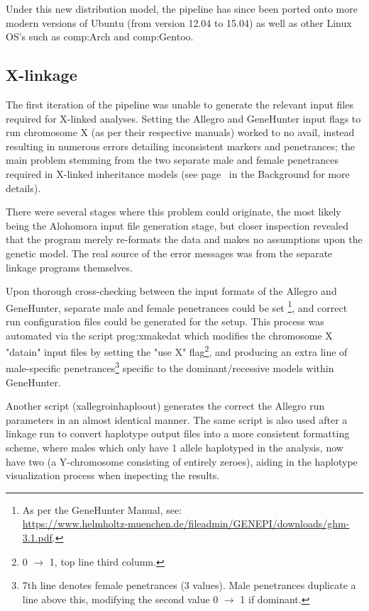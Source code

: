 Under this new distribution model, the pipeline has since been ported onto more modern versions of Ubuntu (from version 12.04 to 15.04) as well as other Linux OS's such as \gls{comp:Arch} and \gls{comp:Gentoo}.


\subsection{X-linkage}

\enlargethispage{\baselineskip}
The first iteration of the pipeline was unable to generate the relevant input files required for X-linked analyses. Setting the Allegro and GeneHunter input flags to run chromosome X (as per their respective manuals) worked to no avail, instead resulting in numerous errors detailing inconsistent markers and penetrances; the main problem stemming from the two separate male and female penetrances required in X-linked inheritance models (see page~\pageref{ref:back:xlinkrec} in the Background for more details).

There were several stages where this problem could originate, the most likely being the Alohomora input file generation stage, but closer inspection revealed that the program merely re-formats the data and makes no assumptions upon the genetic model. The real source of the error messages was from the separate linkage programs themselves.

Upon thorough cross-checking between the input formats of the Allegro and GeneHunter, separate male and female penetrances could be set \footnote{As per the GeneHunter Manual, see:\\\url{https://www.helmholtz-muenchen.de/fileadmin/GENEPI/downloads/ghm-3.1.pdf}.}, and correct run configuration files could be generated for the setup. This process was automated via the script \gls{prog:xmakedat} which modifies the chromosome X "datain" input files by setting the "use X" flag\footnote{0 $\rightarrow$ 1, top line third column.}, and producing an extra line of male-specific penetrances\footnote{7th line denotes female penetrances (3 values). Male penetrances duplicate a line above this, modifying the second value 0 $\rightarrow$ 1 if dominant.} specific to the dominant/recessive models within GeneHunter.

Another script (xallegroinhaploout) generates the correct the Allegro run parameters in an almost identical manner. The same script is also used after a linkage run to convert haplotype output files into a more consistent formatting scheme, where males which only have 1 allele haplotyped in the analysis, now have two (a Y-chromosome consisting of entirely zeroes), aiding in the haplotype visualization process when inspecting the results.


